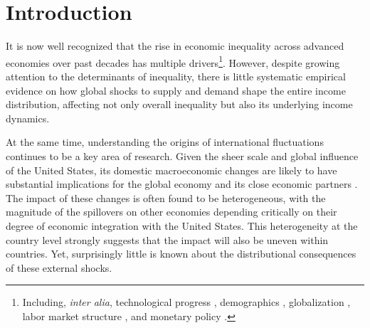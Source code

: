 \documentclass[12pt, a4paper]{article}
\begin{document}



\section{Introduction}
It is now well recognized that the rise in economic inequality across advanced economies over past decades has multiple drivers\footnote{Including, \emph{inter alia}, technological progress \parencite{Bound1995, Acemoglu2002}, demographics \parencite{Karahan2013}, globalization \parencite{feenstra2003global}, labor market structure \parencite{jaumotte2015inequality}, and monetary policy \parencite{coibion2017innocent, furceri2018effects, Amberg2022, andersen2023monetary}.}. However, despite growing attention to the determinants of inequality, there is little systematic empirical evidence on how global shocks to supply and demand shape the entire income distribution, affecting not only overall inequality but also its underlying income dynamics.

At the same time, understanding the origins of international fluctuations continues to be a key area of research. Given the sheer scale and global influence of the United States, its domestic macroeconomic changes are likely to have substantial implications for the global economy and its close economic partners \parencite{Kose2003, Kose2012, kose2017global, kalemli2013global, Fink2015, rey2016, ramey2016macroeconomic, miranda2022global, carrillo2020inquiry, levchenko2020tfp, lakdawala2021international, dees2021global, di2022international, lastauskas2023global}. The impact of these changes is often found to be heterogeneous, with the magnitude of the spillovers on other economies depending critically on their degree of economic integration with the United States. This heterogeneity at the country level strongly suggests that the impact will also be uneven within countries. Yet, surprisingly little is known about the distributional consequences of these external shocks.
\end{document}
